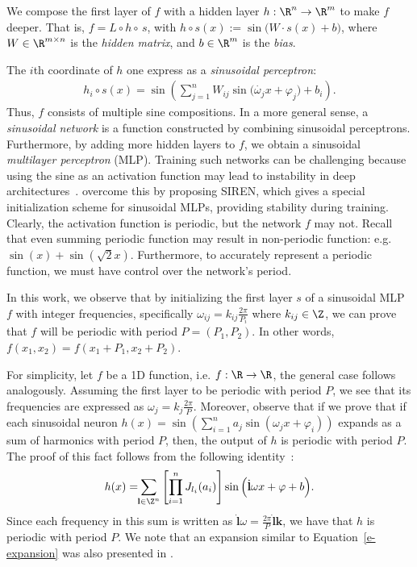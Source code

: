 We compose the first layer of $f$ with a hidden layer $h:\R^{n}\to \R^{m}$ to make $f$ deeper.
That is,
$f=L\circ h \circ \,s$, 
with $h\circ s(x):=\sin\big(W \cdot s(x)+b\big)$, where $W\in\R^{m\times n}$ is the \textit{hidden matrix}, and $b\in\R^{m}$ is the \textit{bias}.


\noindent The $i$th coordinate of $h$ one express as a \textit{sinusoidal perceptron}:
%
\begin{align*}
h_{i}\circ s(x)=\sin\left(\sum_{j=1}^{n} W_{ij} \sin\Big(\dot{\omega_j}{x}+\varphi_j\Big) + b_{i}\right).
\end{align*}
%
Thus, $f$ consists of multiple sine compositions. In a more general sense, a \textit{sinusoidal network} is a function constructed by combining sinusoidal perceptrons.
%
Furthermore, by adding more hidden layers to $f$, we obtain a sinusoidal \textit{multilayer perceptron} (MLP). Training such networks can be challenging because using the sine as an activation function may lead to instability in deep architectures~\cite{taming2017}. \citet{sitzmann2019siren} overcome this by proposing SIREN, which gives a special initialization scheme for sinusoidal MLPs, providing stability during training.
Clearly, the activation function is periodic, but the network $f$ may not.
Recall that even summing periodic function may result in non-periodic function: e.g. $\sin(x)+\sin\left(\sqrt{2}x\right)$. 
Furthermore, to accurately represent a periodic function, we must have control over the network's period.



%
In this work, we observe that by initializing the first layer $s$ of a sinusoidal MLP $f$ with integer frequencies, specifically $\omega_{ij}=k_{ij}\frac{2\pi}{P_i}$ where $k_{ij}\in\Z$, we can prove that $f$ will be periodic with period $P=(P_1,P_{2})$.
In other words, $f(x_1, x_2)=f(x_1+P_1, x_2+P_2)$.

For simplicity, let $f$ be a 1D function, i.e. $f:\R\to\R$, the general case follows analogously. 
Assuming the first layer to be periodic with period $P$, we see that its frequencies are expressed as $\omega_j=k_{j}\frac{2\pi}{P}$. 
Moreover, observe that if we prove that if each sinusoidal neuron $h(x)=\sin\left(\sum_{i=1}^n a_j\sin(\omega_j x + \varphi_i)\right)$ expands as a sum of harmonics with period $P$, then, the output of $h$ is periodic with period $P$. The proof of this fact follows from the following identity~\cite{novello2022understanding}:
\begin{align}\label{e-expansion}
    h(x)= \!\!\sum_{\textbf{l}\in\Z^n}\left[\prod_{i=1}^n J_{l_i}(a_i)\right]\sin\Big(\dot{\textbf{l}}{\omega x +\varphi}+ b\Big).
\end{align}
Since each frequency in this sum is written as $\dot{\textbf{l}}{\omega}=\frac{2\pi}{P}\dot{\textbf{l}}{\textbf{k}}$, we have that $h$ is periodic with period $P$.
We note that an expansion similar to Equation~\ref{e-expansion} was also presented in \cite{yuce2022structured}.


